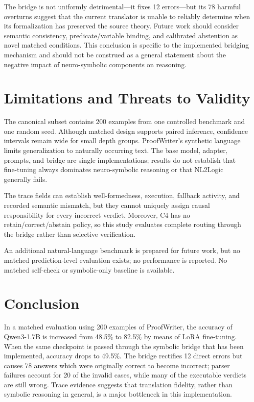 \documentclass[conference]{IEEEtran}
\begin{document}
The bridge is not uniformly detrimental---it fixes 12 errors---but its 78 harmful overturns suggest that the current translator is unable to reliably determine when its formalization has preserved the source theory. Future work should consider semantic consistency, predicate/variable binding, and calibrated abstention as novel matched conditions. This conclusion is specific to the implemented bridging mechanism and should not be construed as a general statement about the negative impact of neuro-symbolic components on reasoning.

\section{Limitations and Threats to Validity}
The canonical subset contains 200 examples from one controlled benchmark and one random seed. Although matched design supports paired inference, confidence intervals remain wide for small depth groups. ProofWriter's synthetic language limits generalization to naturally occurring text. The base model, adapter, prompts, and bridge are single implementations; results do not establish that fine-tuning always dominates neuro-symbolic reasoning or that NL2Logic generally fails.

The trace fields can establish well-formedness, execution, fallback activity, and recorded semantic mismatch, but they cannot uniquely assign causal responsibility for every incorrect verdict. Moreover, C4 has no retain/correct/abstain policy, so this study evaluates complete routing through the bridge rather than selective verification.

An additional natural-language benchmark is prepared for future work, but no matched prediction-level evaluation exists; no performance is reported. No matched self-check or symbolic-only baseline is available.

\section{Conclusion}
In a matched evaluation using 200 examples of ProofWriter, the accuracy of Qwen3-1.7B is increased from 48.5\% to 82.5\% by means of LoRA fine-tuning. When the same checkpoint is passed through the symbolic bridge that has been implemented, accuracy drops to 49.5\%. The bridge rectifies 12 direct errors but causes 78 answers which were originally correct to become incorrect; parser failures account for 20 of the invalid cases, while many of the executable verdicts are still wrong. Trace evidence suggests that translation fidelity, rather than symbolic reasoning in general, is a major bottleneck in this implementation.
\end{document}
